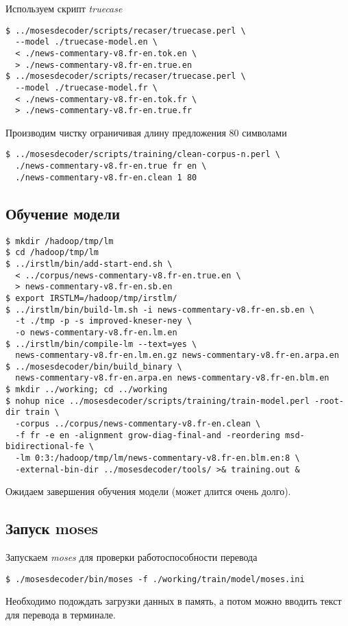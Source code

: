 Используем скрипт \emph{truecase}
\begin{lstlisting}
$ ../mosesdecoder/scripts/recaser/truecase.perl \
  --model ./truecase-model.en \
  < ./news-commentary-v8.fr-en.tok.en \
  > ./news-commentary-v8.fr-en.true.en
$ ../mosesdecoder/scripts/recaser/truecase.perl \
  --model ./truecase-model.fr \
  < ./news-commentary-v8.fr-en.tok.fr \
  > ./news-commentary-v8.fr-en.true.fr
\end{lstlisting}

Производим чистку ограничивая длину предложения 80 символами
\begin{lstlisting}
$ ../mosesdecoder/scripts/training/clean-corpus-n.perl \
  ./news-commentary-v8.fr-en.true fr en \
  ./news-commentary-v8.fr-en.clean 1 80
\end{lstlisting}

\subsection{Обучение модели}
\begin{lstlisting}
$ mkdir /hadoop/tmp/lm
$ cd /hadoop/tmp/lm
$ ../irstlm/bin/add-start-end.sh \
  < ../corpus/news-commentary-v8.fr-en.true.en \
  > news-commentary-v8.fr-en.sb.en
$ export IRSTLM=/hadoop/tmp/irstlm/
$ ../irstlm/bin/build-lm.sh -i news-commentary-v8.fr-en.sb.en \
  -t ./tmp -p -s improved-kneser-ney \
  -o news-commentary-v8.fr-en.lm.en
$ ../irstlm/bin/compile-lm --text=yes \
  news-commentary-v8.fr-en.lm.en.gz news-commentary-v8.fr-en.arpa.en
$ ../mosesdecoder/bin/build_binary \
  news-commentary-v8.fr-en.arpa.en news-commentary-v8.fr-en.blm.en
$ mkdir ../working; cd ../working
$ nohup nice ../mosesdecoder/scripts/training/train-model.perl -root-dir train \
  -corpus ../corpus/news-commentary-v8.fr-en.clean \
  -f fr -e en -alignment grow-diag-final-and -reordering msd-bidirectional-fe \
  -lm 0:3:/hadoop/tmp/lm/news-commentary-v8.fr-en.blm.en:8 \
  -external-bin-dir ../mosesdecoder/tools/ >& training.out &
\end{lstlisting}
Ожидаем завершения обучения модели (может длится очень долго).

\subsection{Запуск moses}
Запускаем \emph{moses} для проверки работоспособности перевода
\begin{lstlisting}
$ ./mosesdecoder/bin/moses -f ./working/train/model/moses.ini
\end{lstlisting}
Необходимо подождать загрузки данных в память, а потом можно вводить текст для перевода в терминале.

